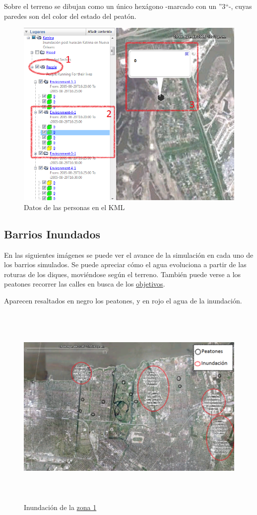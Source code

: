 Sobre el terreno se dibujan como un único hexágono -marcado con un ''3``-,
cuyas paredes son del color del estado del peatón.

\begin{figure}[H]
 \centering
 \includegraphics[width=130mm]{figuras/cap6/resultados/people_data.png}
 \caption{Datos de las personas en el KML}
\end{figure}

\subsection{Barrios Inundados}

En las siguientes imágenes se puede ver el avance de la simulación en cada uno
de los barrios simulados. Se puede apreciar cómo el agua evoluciona a partir de
las roturas de los diques, moviéndose según el terreno. También puede verse a
los peatones recorrer las calles en busca de los
\hyperref[objetivos]{objetivos}.

Aparecen resaltados en negro los peatones, y en rojo el agua de la inundación.

\begin{figure}[H]
 \centering
 \includegraphics[height=100mm,angle=90]{figuras/cap6/resultados/katrina1.png}
 \caption{Inundación de la \hyperref[zona1]{zona 1}}
\end{figure}

